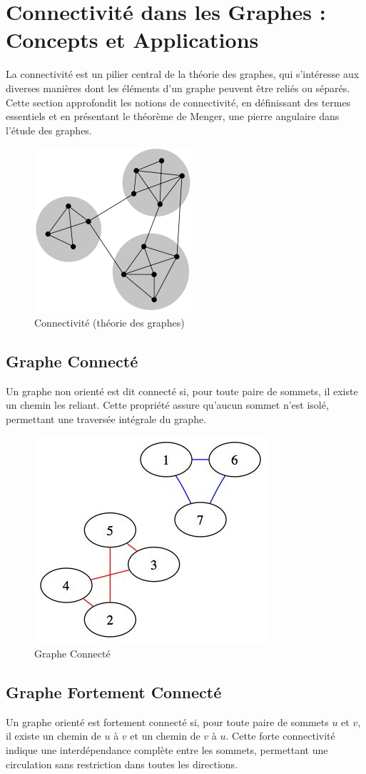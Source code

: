 \section{Connectivité dans les Graphes : Concepts et Applications}

La connectivité est un pilier central de la théorie des graphes, qui s'intéresse aux diverses manières dont les éléments d'un graphe peuvent être reliés ou séparés. Cette section approfondit les notions de connectivité, en définissant des termes essentiels et en présentant le théorème de Menger, une pierre angulaire dans l'étude des graphes.

\begin{figure}[H]
    \centering
    \includegraphics[width=0.3 \textwidth]{Assets/connectivite.png}
    \caption{Connectivité (théorie des graphes)}
    \label{fig:Connectivité (théorie des graphes)}
\end{figure}


\subsection{Graphe Connecté}
Un graphe non orienté est dit connecté si, pour toute paire de sommets, il existe un chemin les reliant. Cette propriété assure qu'aucun sommet n'est isolé, permettant une traversée intégrale du graphe.

\begin{figure}[H]
    \centering
    \includegraphics[width=0.3 \textwidth]{Assets/graphe connecte.jpg}
    \caption{Graphe Connecté}
    \label{fig:Graphe Connecté}
\end{figure}

\subsection{Graphe Fortement Connecté}
Un graphe orienté est fortement connecté si, pour toute paire de sommets \( u \) et \( v \), il existe un chemin de \( u \) à \( v \) et un chemin de \( v \) à \( u \). Cette forte connectivité indique une interdépendance complète entre les sommets, permettant une circulation sans restriction dans toutes les directions.

